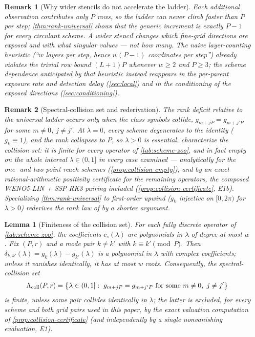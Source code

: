 \documentclass[pdflatex,sn-mathphys-num]{sn-jnl}%
\theoremstyle{thmstyleone}%
\newtheorem{lemma}{Lemma}%
\theoremstyle{thmstyletwo}%
\newtheorem{remark}{Remark}%
\theoremstyle{thmstylethree}%
\begin{document}
\begin{remark}[Why wider stencils do not accelerate the ladder]\label{rem:no-acceleration}
Each additional observation contributes only $P$ rows, so the ladder can never climb faster than $P$ per step; \cref{thm:rank-universal} shows that the generic increment is exactly $P-1$ for \emph{every} circulant scheme.
A wider stencil changes \emph{which} fine-grid directions are exposed and with what singular values --- not how many.
The naive layer-counting heuristic (\enquote{$w$ layers per step, hence $w(P-1)$ coordinates per step}) already violates the trivial row bound $(L+1)P$ whenever $w\ge2$ and $P\ge3$; the scheme dependence anticipated by that heuristic instead reappears in the per-parent exposure rate and detection delay (\cref{sec:local}) and in the conditioning of the exposed directions (\cref{sec:conditioning}).
\end{remark}

\begin{remark}[Spectral-collision set and rederivation]\label{rem:collision-set}
The rank deficit relative to the universal ladder occurs only when the class symbols collide, $g_{m+jP}=g_{m+j'P}$ for some $m\ne0$, $j\ne j'$.
At $\lambda=0$, every scheme degenerates to the identity ($g_k\equiv1$), and the rank collapses to $P$, so $\lambda>0$ is essential.
 characterize the collision set: it is finite for every operator of \cref{tab:scheme-zoo}, and in fact empty on the whole interval $\lambda\in(0,1]$ in every case examined --- analytically for the one- and two-point reach schemes (\cref{prop:collision-empty}), and by an exact rational-arithmetic positivity certificate for the remaining operators, the composed WENO5-LIN + SSP-RK3 pairing included (\cref{prop:collision-certificate}, E1b).
Specializing \cref{thm:rank-universal} to first-order upwind ($g_k$ injective on $[0,2\pi)$ for $\lambda>0$) rederives the rank law of \cite{PolemitisChristakisDrikakis2026FVerasure} by a shorter argument.
\end{remark}

\begin{lemma}[Finiteness of the collision set]\label{lem:collision-finite}
For each fully discrete operator of \cref{tab:scheme-zoo}, the coefficients $c_s(\lambda)$ are polynomials in $\lambda$ of degree at most $w$.
Fix $(P,r)$ and a mode pair $k\ne k'$ with $k\equiv k'\pmod P$.
Then $\delta_{k,k'}(\lambda)=g_k(\lambda)-g_{k'}(\lambda)$ is a polynomial in $\lambda$ with complex coefficients; unless it vanishes identically, it has at most $w$ roots.
Consequently, the spectral-collision set \[ \Lambda_{\rm coll}(P,r) = \bigl\{\lambda\in(0,1]:\ g_{m+jP}=g_{m+j'P} \ \text{for some}\ m\ne0,\ j\ne j'\bigr\} \] is finite, unless some pair collides identically in $\lambda$; the latter is excluded, for every scheme and both grid pairs used in this paper, by the exact valuation computation of \cref{prop:collision-certificate} (and independently by a single nonvanishing evaluation, E1).
\end{lemma}
\end{document}
